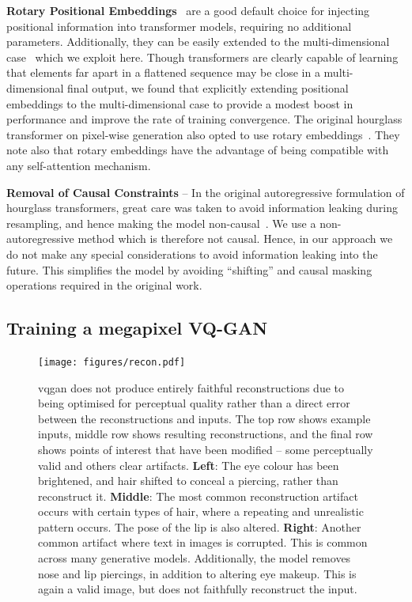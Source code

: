\textbf{Rotary Positional Embeddings}~\cite{su2021roformer} are a good default
choice for injecting positional information into transformer models, requiring
no additional parameters. Additionally, they can be easily extended to the
multi-dimensional case~\cite{rope-eleutherai} which we exploit here. Though
transformers are clearly capable of learning that elements far apart in a
flattened sequence may be close in a multi-dimensional final output, we found
that explicitly extending positional embeddings to the multi-dimensional case to
provide a modest boost in performance and improve the rate of training
convergence. The original hourglass transformer on pixel-wise generation also
opted to use rotary embeddings~\cite{nawrot2021hierarchical}. They note also
that rotary embeddings have the advantage of being compatible with any
self-attention mechanism.

\textbf{Removal of Causal Constraints} -- In the original autoregressive
formulation of hourglass transformers, great care was taken to avoid information
leaking during resampling, and hence making the model
non-causal~\cite{nawrot2021hierarchical}. We use a non-autoregressive method
which is therefore not causal. Hence, in our approach we do not make any special
considerations to avoid information leaking into the future. This simplifies the
model by avoiding ``shifting'' and causal masking operations required in the original work.

\subsection{Training a megapixel VQ-GAN}
\label{sec:megagan}

\begin{figure}[ht]
    \label{fig:recon}
    \centering
    \texttt{[image: figures/recon.pdf]}
    \caption{
        \gls{vqgan} does not produce entirely faithful reconstructions due to
        being optimised for perceptual quality rather than a direct error between
        the reconstructions and inputs. The top row shows example inputs, middle row
        shows resulting reconstructions, and the final row shows points of interest that
        have been modified -- some perceptually valid and others clear
        artifacts. 
        \textbf{Left}: The eye colour has been brightened, and hair
        shifted to conceal a piercing, rather than reconstruct it.
        \textbf{Middle}: The most common reconstruction artifact occurs with
        certain types of hair, where a repeating and unrealistic pattern occurs. The
        pose of the lip is also altered. 
        \textbf{Right}: Another common artifact where text in images is
        corrupted. This is common across many generative models. Additionally,
        the model removes nose and lip piercings, in addition to altering eye
        makeup. This is again a valid image, but does not faithfully reconstruct
        the input.}
\end{figure}

